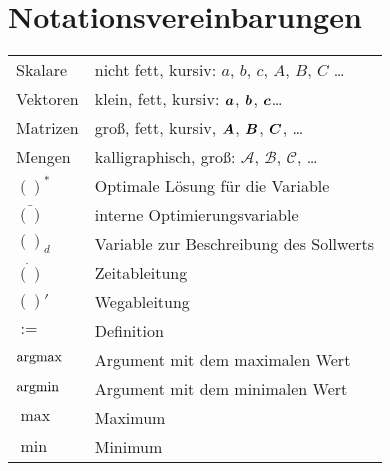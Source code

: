 \vspace{1cm}

\section*{Notationsvereinbarungen}
\vspace{-4mm}
\begin{longtable}{p{26mm}p{89mm}}
Skalare         & nicht fett, kursiv: $a$, $b$, $c$, $A$, $B$, $C$ \ldots\\
Vektoren        & klein, fett, kursiv: $\boldsymbol{a}$, $\boldsymbol{b}$, $\boldsymbol{c}$\ldots\\
Matrizen        & groß, fett, kursiv, $\boldsymbol{A}$, $\boldsymbol{B}$, $\boldsymbol{C}$, \ldots\\
Mengen          & kalligraphisch, gro{\ss}: $\mathcal{A}$, $\mathcal{B}$, $\mathcal{C}$, \ldots\\
$()^\ast$ 	& Optimale Lösung für die Variable\\
$\bar{()}$ 	& interne Optimierungsvariable\\
$()_d$				& Variable zur Beschreibung des Sollwerts \\
$\dot{()}$	& Zeitableitung \\
${()'}$			& Wegableitung \\
$:=$        & Definition \\
${\rm argmax}$ &  Argument mit dem maximalen Wert \\
${\rm argmin}$ &  Argument mit dem minimalen Wert \\
$\max$ & Maximum \\
$\min$ & Minimum \\
\end{longtable}

